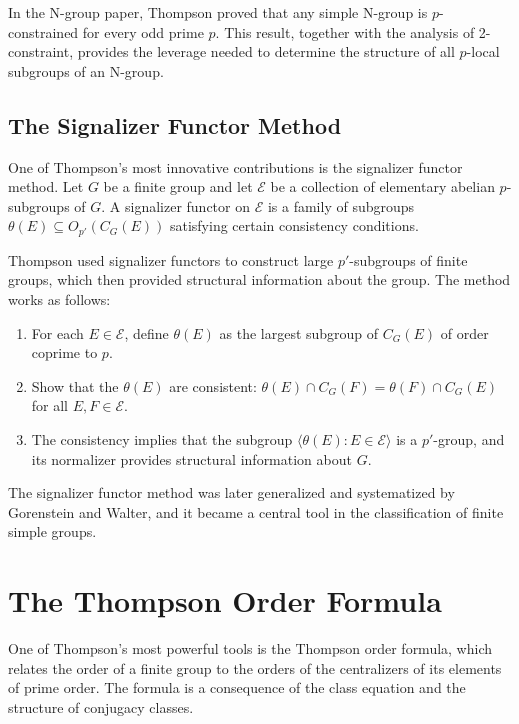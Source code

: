 In the N-group paper, Thompson proved that any simple N-group is \(p\)-constrained for every odd prime \(p\). This result, together with the analysis of 2-constraint, provides the leverage needed to determine the structure of all \(p\)-local subgroups of an N-group.

\subsection{The Signalizer Functor Method}

One of Thompson's most innovative contributions is the signalizer functor method. Let \(G\) be a finite group and let \(\mathcal{E}\) be a collection of elementary abelian \(p\)-subgroups of \(G\). A signalizer functor on \(\mathcal{E}\) is a family of subgroups \(\theta(E) \subseteq O_{p'}(C_G(E))\) satisfying certain consistency conditions.

Thompson used signalizer functors to construct large \(p'\)-subgroups of finite groups, which then provided structural information about the group. The method works as follows:

\begin{enumerate}
\item For each \(E \in \mathcal{E}\), define \(\theta(E)\) as the largest subgroup of \(C_G(E)\) of order coprime to \(p\).

\item Show that the \(\theta(E)\) are consistent: \(\theta(E) \cap C_G(F) = \theta(F) \cap C_G(E)\) for all \(E,F \in \mathcal{E}\).

\item The consistency implies that the subgroup \(\langle \theta(E) : E \in \mathcal{E} \rangle\) is a \(p'\)-group, and its normalizer provides structural information about \(G\).
\end{enumerate}

The signalizer functor method was later generalized and systematized by Gorenstein and Walter, and it became a central tool in the classification of finite simple groups.

\section{The Thompson Order Formula}

One of Thompson's most powerful tools is the Thompson order formula, which relates the order of a finite group to the orders of the centralizers of its elements of prime order. The formula is a consequence of the class equation and the structure of conjugacy classes.

